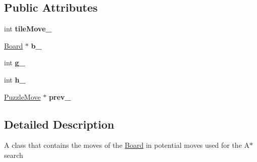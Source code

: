 \subsection*{\-Public \-Attributes}
\begin{DoxyCompactItemize}
\item 
\hypertarget{classPuzzleMove_aa2fffc45e00d35346c0f88cab11b8e5a}{int {\bfseries tile\-Move\-\_\-}}\label{classPuzzleMove_aa2fffc45e00d35346c0f88cab11b8e5a}

\item 
\hypertarget{classPuzzleMove_a31158ed0a7fa5c8d814cdedb0369e358}{\hyperlink{classBoard}{\-Board} $\ast$ {\bfseries b\-\_\-}}\label{classPuzzleMove_a31158ed0a7fa5c8d814cdedb0369e358}

\item 
\hypertarget{classPuzzleMove_a5447ee712ef759570d47dd585bfd4ee2}{int {\bfseries g\-\_\-}}\label{classPuzzleMove_a5447ee712ef759570d47dd585bfd4ee2}

\item 
\hypertarget{classPuzzleMove_a15335bf6718edc6ccf4577d0352d8deb}{int {\bfseries h\-\_\-}}\label{classPuzzleMove_a15335bf6718edc6ccf4577d0352d8deb}

\item 
\hypertarget{classPuzzleMove_a316ee56f76f0f21b61a9f4d027215f1e}{\hyperlink{classPuzzleMove}{\-Puzzle\-Move} $\ast$ {\bfseries prev\-\_\-}}\label{classPuzzleMove_a316ee56f76f0f21b61a9f4d027215f1e}

\end{DoxyCompactItemize}


\subsection{\-Detailed \-Description}
\-A class that contains the moves of the \hyperlink{classBoard}{\-Board} in potential moves used for the \-A$\ast$ search 

